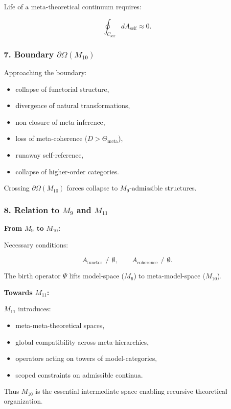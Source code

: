 Life of a meta-theoretical continuum requires:

\[
\oint_{C_{\mathrm{self}}} dA_{\mathrm{self}} \approx 0.
\]

\subsubsection*{7. Boundary $\partial\Omega(M_{10})$}

Approaching the boundary:

\begin{itemize}
    \item collapse of functorial structure,
    \item divergence of natural transformations,
    \item non-closure of meta-inference,
    \item loss of meta-coherence ($D>\Theta_{\mathrm{meta}}$),
    \item runaway self-reference,
    \item collapse of higher-order categories.
\end{itemize}

Crossing $\partial\Omega(M_{10})$ forces collapse to $M_9$-admissible structures.

\subsubsection*{8. Relation to \texorpdfstring{$M_9$}{M_9} and $M_{11}$}

\textbf{From $M_9$ to $M_{10}$:}

Necessary conditions:

\[
A_{\mathrm{functor}}\neq\emptyset,\qquad
A_{\mathrm{coherence}}\neq\emptyset.
\]

The birth operator $\Psi$ lifts model-space ($M_9$) to meta-model-space ($M_{10}$).

\textbf{Towards $M_{11}$:}

$M_{11}$ introduces:

\begin{itemize}
    \item meta-meta-theoretical spaces,
    \item global compatibility across meta-hierarchies,
    \item operators acting on towers of model-categories,
    \item scoped constraints on admissible continua.
\end{itemize}

Thus $M_{10}$ is the essential intermediate space enabling
recursive theoretical organization.
